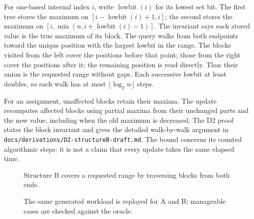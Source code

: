 \documentclass[11pt,a4paper]{article}
\begin{document}
For one-based internal index $i$, write $\operatorname{lowbit}(i)$ for its lowest set bit. The first tree stores the maximum on $[i-\operatorname{lowbit}(i)+1,i]$; the second stores the maximum on $[i,\min(n,i+\operatorname{lowbit}(i)-1)]$. The invariant says each stored value is the true maximum of its block. The query walks from both endpoints toward the unique position with the largest lowbit in the range. The blocks visited from the left cover the positions before that point; those from the right cover the positions after it; the remaining position is read directly. Thus their union is the requested range without gaps. Each successive lowbit at least doubles, so each walk has at most $\lfloor\log_2 w\rfloor$ steps.

For an assignment, unaffected blocks retain their maxima. The update recomputes affected blocks using partial maxima from their unchanged parts and the new value, including when the old maximum is decreased. The D2 proof states the block invariant and gives the detailed walk-by-walk argument in \texttt{docs/derivations/D2-structureB-draft.md}. The bound concerns its counted algorithmic steps; it is not a claim that every update takes the same elapsed time.

\begin{figure}[ht]
\centering
{}
\caption{Structure B covers a requested range by traversing blocks from both ends.}
\end{figure}

\begin{figure}[ht]
\centering
{}
\caption{The same generated workload is replayed for A and B; manageable cases are checked against the oracle.}
\end{figure}
\end{document}
